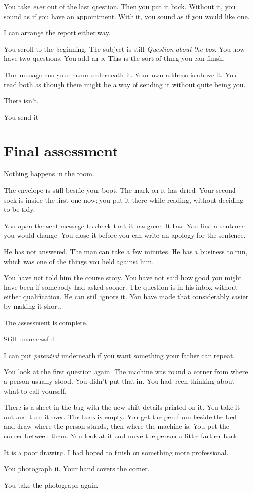 \documentclass[11pt,oneside]{book}
\begin{document}
You take \emph{ever} out of the last question. Then you put it back. Without it, you sound as if you have an appointment. With it, you sound as if you would like one.

I can arrange the report either way.

You scroll to the beginning. The subject is still \emph{Question about the box}. You now have two questions. You add an \emph{s}. This is the sort of thing you can finish.

The message has your name underneath it. Your own address is above it. You read both as though there might be a way of sending it without quite being you.

There isn't.

You send it.

\section*{Final assessment}

Nothing happens in the room.

The envelope is still beside your boot. The mark on it has dried. Your second sock is inside the first one now; you put it there while reading, without deciding to be tidy.

You open the sent message to check that it has gone. It has. You find a sentence you would change. You close it before you can write an apology for the sentence.

He has not answered. The man can take a few minutes. He has a business to run, which was one of the things you held against him.

You have not told him the course story. You have not said how good you might have been if somebody had asked sooner. The question is in his inbox without either qualification. He can still ignore it. You have made that considerably easier by making it short.

The assessment is complete.

Still unsuccessful.

I can put \emph{potential} underneath if you want something your father can repeat.

You look at the first question again. The machine was round a corner from where a person usually stood. You didn't put that in. You had been thinking about what to call yourself.

There is a sheet in the bag with the new shift details printed on it. You take it out and turn it over. The back is empty. You get the pen from beside the bed and draw where the person stands, then where the machine is. You put the corner between them. You look at it and move the person a little farther back.

It is a poor drawing. I had hoped to finish on something more professional.

You photograph it. Your hand covers the corner.

You take the photograph again.
\end{document}
